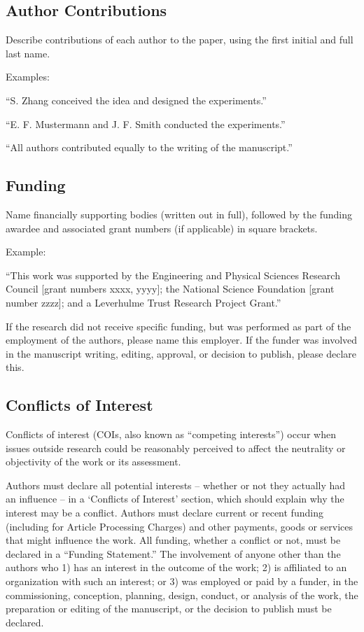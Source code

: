 \documentclass{article}
\begin{document}
\subsection{Author Contributions} 
Describe contributions of each author to the paper, using the first initial and full last name. 

\medskip Examples:

``S. Zhang conceived the idea and designed the experiments.''

``E. F. Mustermann and J. F. Smith conducted the experiments.''

``All authors contributed equally to the writing of the manuscript.''

\subsection{Funding}
Name financially supporting bodies (written out in full), followed by the funding awardee and associated grant numbers (if applicable) in square brackets. 

\medskip Example: 

``This work was supported by the Engineering and Physical Sciences Research Council [grant numbers xxxx, yyyy]; the National Science Foundation [grant number zzzz]; and a Leverhulme Trust Research Project Grant.'' 

\medskip
If the research did not receive specific funding, but was performed as part of the employment of the authors, please name this employer. If the funder was involved in the manuscript writing, editing, approval, or decision to publish, please declare this.

\subsection{Conflicts of Interest}
Conflicts of interest (COIs, also known as ``competing interests'') occur when issues outside research could be reasonably perceived to affect the neutrality or objectivity of the work or its assessment. 

Authors must declare all potential interests – whether or not they actually had an influence – in a ‘Conflicts of Interest’ section, which should explain why the interest may be a conflict. Authors must declare current or recent funding (including for Article Processing Charges) and other payments, goods or services that might influence the work. All funding, whether a conflict or not, must be declared in a ``Funding Statement.'' The involvement of anyone other than the authors who 1) has an interest in the outcome of the work; 2) is affiliated to an organization with such an interest; or 3) was employed or paid by a funder, in the commissioning, conception, planning, design, conduct, or analysis of the work, the preparation or editing of the manuscript, or the decision to publish must be declared.
\end{document}
